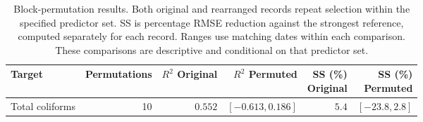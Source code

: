 \begin{table}[!htbp]
\caption{Block-permutation results. Both original and rearranged records repeat selection within the specified predictor set. SS is percentage RMSE reduction against the strongest reference, computed separately for each record. Ranges use matching dates within each comparison. These comparisons are descriptive and conditional on that predictor set.\label{tab:block_permutation}}
\small\begin{tabularx}{\textwidth}{Xrrrrr}\toprule Target & Permutations & \makecell{$R^2$\\Original} & \makecell{$R^2$\\Permuted} & \makecell{SS (\%)\\Original} & \makecell{SS (\%)\\Permuted}\\\midrule
Total coliforms & 10 & $0.552$ & $[-0.613, 0.186]$ & $5.4$ & $[-23.8, 2.8]$\\
\bottomrule\end{tabularx}\end{table}
